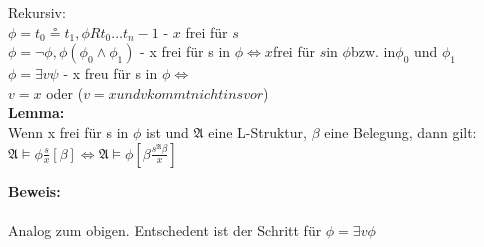 \documentclass[a4paper]{scrartcl}
\newcommand{\mfa}{\mathfrak{A}}  %
\begin{document}
			Rekursiv:\medskip\\
			$\phi = t_0 \circeq t_1, \phi R t_0 \dots t_n-1 $ - $x$ frei für $s$ \medskip\\
			$\phi = \lnot \phi , \phi (\phi_0 \wedge \phi_1)$ - x frei für s in $\phi \Leftrightarrow x $frei für $s $in $\phi $bzw. in$ \phi_0$ und $\phi_1$ \medskip\\
			$\phi = \exists v \psi$ - x freu für s in $\phi \Leftrightarrow$\\ 
			$v = x$ oder ($v = x und v kommt nicht in s vor$)\medskip\\
			
		\textbf{Lemma:}\\
		Wenn x frei für s in $\phi$ ist und $\mfa$ eine L-Struktur, $\beta$ eine Belegung, dann gilt:\\
		$\mfa \models \phi \frac{s}{x} \left[ \beta \right] \Leftrightarrow \mfa \models \phi \left[ \beta \frac{s^{\mfa}\beta}{x} \right]$

		\textbf{Beweis:}\\\\
		Analog zum obigen. Entschedent ist der Schritt für $\phi = \exists v \phi$
\end{document}
